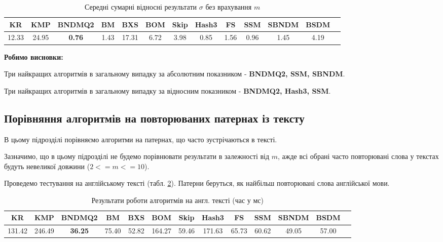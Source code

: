 \documentclass[a4paper,14pt]{extarticle} %
\begin{document}
				\begin{table}[H]
					\centering
					\scriptsize
					\begin{tabular}{|c|c|c|c|c|c|c|c|c|c|c|c|c|}
					\hline
					\textbf{KR} & \textbf{KMP} & \textbf{BNDMQ2} & \textbf{BM} & \textbf{BXS} & \textbf{BOM} & \textbf{Skip} & \textbf{Hash3} & \textbf{FS} & \textbf{SSM} & \textbf{SBNDM} & \textbf{BSDM} \\
					\hline
					12.33 & 24.95 & \textbf{0.76} & 1.43 & 17.31 & 6.72 & 3.98 & 0.85 & 1.56 & 0.96 & 1.45 & 4.19 \\
					\hline
					\end{tabular}
					\caption{Середні сумарні відносні результати $\sigma$ без врахування $m$}
					\label{table:random_final_relative}
				\end{table}
				\textbf{Робимо висновки:}

				Три найкращих алгоритмів в загальному випадку за абсолютним показником - \textbf{BNDMQ2, SSM, SBNDM}.

				Три найкращих алгоритмів в загальному випадку за відносним показником - \textbf{BNDMQ2, Hash3, SSM}.

				\subsection{Порівняння алгоритмів на повторюваних патернах із тексту}

				В цьому підрозділі порівняємо алгоритми на патернах, що часто зустрічаються в тексті.
				
				Зазначимо, що в цьому підрозділі не будемо порівнювати результати в залежності від $m$, ажде всі обрані часто повторювані слова у текстах будуть невеликої довжини ($2<=m<=10$).

				Проведемо тестування на англійському тексті (табл. \ref{table:uniqueEnglish}). Патерни беруться, як найбільш повторювані слова англійської мови.
				\begin{table}[H]
					\centering
					\scriptsize
					\begin{tabular}{|c|c|c|c|c|c|c|c|c|c|c|c|c|}
					\hline
					\textbf{KR} & \textbf{KMP} & \textbf{BNDMQ2} & \textbf{BM} & \textbf{BXS} & \textbf{BOM} & \textbf{Skip} & \textbf{Hash3} & \textbf{FS} & \textbf{SSM} & \textbf{SBNDM} & \textbf{BSDM} \\
					\hline
					131.42 & 246.49 & \textbf{36.25} & 75.40 & 52.82 & 164.27 & 59.46 & 171.63 & 65.73 & 60.62 & 49.05 & 57.00 \\
					\hline
					\end{tabular}
					\caption{Результати роботи алгоритмів на англ. тексті (час у мс)}
					\label{table:uniqueEnglish}
				\end{table}
\end{document}
